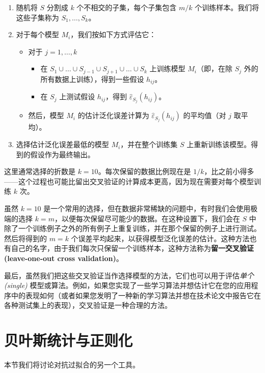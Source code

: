 \begin{enumerate}
    \item 随机将 $S$ 分割成 $k$ 个不相交的子集，每个子集包含 $m/k$ 个训练样本。我们将这些子集称为 $S_1, \dots, S_k$。
    \item 对于每个模型 $M_i$，我们按如下方式评估它：
    \begin{itemize}
        \item[] 对于 $j=1, \dots, k$
        \begin{itemize}
            \item[] 在 $S_1 \cup \dots \cup S_{j-1} \cup S_{j+1} \cup \dots \cup S_k$ 上训练模型 $M_i$（即，在除 $S_j$ 外的所有数据上训练），得到一些假设 $h_{ij}$。
            \item[] 在 $S_j$ 上测试假设 $h_{ij}$，得到 $\hat{\varepsilon}_{S_j}(h_{ij})$。
        \end{itemize}
        \item[] 然后，模型 $M_i$ 的估计泛化误差计算为 $\hat{\varepsilon}_{S_j}(h_{ij})$ 的平均值（对 $j$ 取平均）。
    \end{itemize}
    \item 选择估计泛化误差最低的模型 $M_i$，并在整个训练集 $S$ 上重新训练该模型。得到的假设作为最终输出。
\end{enumerate}

这里通常选择的折数是 $k=10$。每次保留的数据比例现在是 $1/k$，比之前小得多——这个过程也可能比留出交叉验证的计算成本更高，因为现在需要对每个模型训练 $k$ 次。

虽然 $k=10$ 是一个常用的选择，但在数据非常稀缺的问题中，有时我们会使用极端的选择 $k=m$，以便每次保留尽可能少的数据。在这种设置下，我们会在 $S$ 中除了一个训练例子之外的所有例子上重复训练，并在那个保留的例子上进行测试。然后将得到的 $m=k$ 个误差平均起来，以获得模型泛化误差的估计。这种方法也有自己的名字，由于我们每次只保留一个训练样本，这种方法称为\textbf{留一交叉验证 (leave-one-out cross validation)}。

最后，虽然我们把这些交叉验证当作选择模型的方法，它们也可以用于评估\textit{单个 (single)} 模型或算法。例如，如果您实现了一些学习算法并想估计它在您的应用程序中的表现如何（或者如果您发明了一种新的学习算法并想在技术论文中报告它在各种测试集上的表现），交叉验证是一种合理的方法。

\section{贝叶斯统计与正则化}\label{sec:9.4}

本节我们将讨论对抗过拟合的另一个工具。

